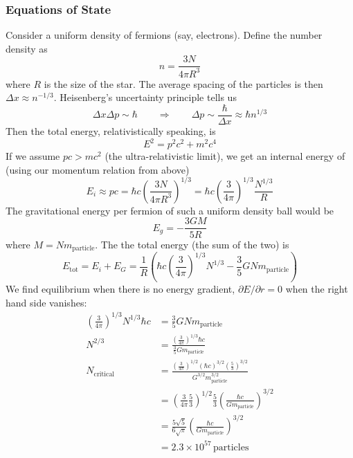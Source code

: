 \documentclass[10pt]{article}
\numberwithin{equation}{section}
\newcommand{\n}{\noindent}
\begin{document}
		\subsubsection{Equations of State} %
		\label{ssub:equations_of_state}
		\n Consider a uniform density of fermions (say, electrons). Define the number density as
		\begin{equation}
			\label{eq:wd_struc:4} n = \frac{3N}{4\pi R^3}
		\end{equation}
		where $R$ is the size of the star. The average spacing of the particles is then $\Delta x \approx n^{-1/3}$. Heisenberg's uncertainty principle tells us 
		\begin{equation}
			\label{eq:wd_struc:5} \Delta x \Delta p \sim \hbar \qquad \Rightarrow \qquad \Delta p \sim \frac{\hbar}{\Delta x} \approx \hbar n^{1/3}
		\end{equation}
		Then the total energy, relativistically speaking, is
		\begin{equation}
			\label{eq:wd_struc:6} E^2 = p^2c^2 + m^2c^4
		\end{equation}
		If we assume $pc > mc^2$ (the ultra-relativistic limit), we get an internal energy of (using our momentum relation from above)
		\begin{equation}
			\label{eq:wd_struc:7} E_i \approx pc = \hbar c\left(\frac{3N}{4\pi R^3}\right)^{1/3} = \hbar c\left(\frac{3}{4\pi}\right)^{1/3}\frac{N^{1/3}}{R}
		\end{equation}
		The gravitational energy per fermion of such a uniform density ball would be
		\begin{equation}
			\label{eq:wd_struc:8} E_g = -\frac{3G M}{5 R}
		\end{equation}
		where $M = N m_{\mathrm{particle}}$. The the total energy (the sum of the two) is 
		\begin{equation}
			\label{eq:wd_struc:9} E_{\mathrm{tot}} = E_i + E_G = \frac{1}{R}\left(\hbar c\left(\frac{3}{4\pi}\right)^{1/3}N^{1/3} - \frac{3}{5}G Nm_{\mathrm{particle}}\right)
		\end{equation}
		We find equilibrium when there is no energy gradient, $\partial E/\partial r = 0$ when the right hand side vanishes: 
		\begin{align}
			\label{eq:wd_struc:10} \left(\frac{3}{4\pi}\right)^{1/3}N^{1/3}\hbar c &= \frac{3}{5}GNm_{\mathrm{particle}} \\
			\label{eq:wd_struc:11} N^{2/3} &= \frac{\left(\frac{3}{4\pi}\right)^{1/3}\hbar c}{\frac{3}{5}Gm_{\mathrm{particle}}} \\
			\label{eq:wd_struc:12} N_{\mathrm{critical}} &= \frac{ \left(\frac{3}{4\pi}\right)^{1/2}\left(\hbar c\right)^{3/2}\left(\frac{5}{3}\right)^{3/2} }{ G^{3/2}m_{\mathrm{particle}}^{3/2}}\\
			\label{eq:wd_struc:13} &= \left(\frac{3}{4\pi}\frac{5}{3}\right)^{1/2}\frac{5}{3}\left(\frac{\hbar c}{G m_{\mathrm{particle}}}\right)^{3/2}\\
			\label{eq:wd_struc:14} &= \frac{5\sqrt{5}}{6\sqrt{\pi}}\left(\frac{\hbar c}{Gm_{\mathrm{particle}}}\right)^{3/2}\\
			\label{eq:wd_struc:15} &= 2.3\times 10^{57}\,\mathrm{particles}
		\end{align}
\end{document}
